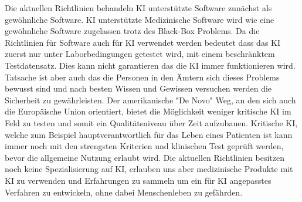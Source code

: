 Die aktuellen Richtlinien behandeln KI unterstützte Software zunächst als gewöhnliche Software. KI unterstützte Medizinische Software wird wie eine gewöhnliche Software zugelassen trotz des Black-Box Problems. Da die Richtlinien für Software auch für KI verwendet werden bedeutet dass das KI zuerst nur unter Laborbedingungen getestet wird, mit einem beschränktem Testdatensatz. Dies kann nicht garantieren das die KI immer funktionieren wird. Tatsache ist aber auch das die Personen in den Ämtern sich dieses Problems bewusst sind und nach besten Wissen und Gewissen versuchen werden die Sicherheit zu gewährleisten. Der amerikanische "De Novo" Weg, an den sich auch die Europäische Union orientiert, bietet die Möglichkeit weniger kritische KI im Feld zu testen und somit ein Qualitätsniveau über Zeit aufzubauen. Kritische KI, welche zum Beispiel hauptverantwortlich für das Leben eines Patienten ist kann immer noch mit den strengsten Kriterien und klinischen Test geprüft werden, bevor die allgemeine Nutzung erlaubt wird. Die aktuellen Richtlinien besitzen noch keine Spezialisierung auf KI, erlauben uns aber medizinische Produkte mit KI zu verwenden und Erfahrungen zu sammeln um ein für KI angepasstes Verfahren zu entwickeln, ohne dabei Menschenleben zu gefährden.